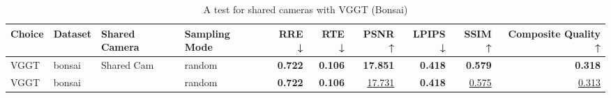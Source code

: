 \begin{table}[H]
\caption{A test for shared cameras with VGGT (Bonsai)}
\label{tab:06_shared_camera_vggt_bonsai}
\footnotesize
\begin{tabular}{llllrrrrrr}
\toprule
Choice & Dataset & Shared Camera & Sampling Mode & RRE ↓ & RTE ↓ & PSNR ↑ & LPIPS ↓ & SSIM ↑ & Composite Quality ↑ \\
\midrule
VGGT & bonsai & Shared Cam & random & \textbf{0.722} & \textbf{0.106} & \textbf{17.851} & \textbf{0.418} & \textbf{0.579} & \textbf{0.318} \\
VGGT & bonsai &  & random & \textbf{0.722} & \textbf{0.106} & \underline{17.731} & \textbf{0.418} & \underline{0.575} & \underline{0.313} \\
\bottomrule
\end{tabular}
\end{table}